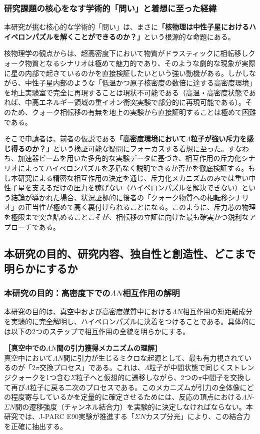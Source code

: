 \documentclass[11pt,a4j,dvipdfmx]{jarticle} 					%
\newcommand{\研究課題名}{加速器実験による短距離バリオン間相互作用の解明と中性子星ハイペロンパズルの解決}
\newcommand{\研究機関名}{東北大学}
\newcommand{\研究代表者氏名}{市川裕大}
\newcommand{\研究期間の最終元号年度}{13}  %
\begin{document}
\subsubsection{研究課題の核心をなす学術的「問い」と着想に至った経緯}
本研究が挑む核心的な学術的「問い」は、まさに\textbf{「核物理は中性子星におけるハイペロンパズルを解くことができるのか？」}という根源的な命題にある。

核物理学の観点からは、超高密度下において物質がドラスティックに相転移しクォーク物質となるシナリオは極めて魅力的であり、そのような劇的な現象が実際に星の内部で起きているのかを直接検証したいという強い動機がある。しかしながら、中性子星内部のような「低温かつ原子核密度の数倍に達する高密度環境」を地上実験室で完全に再現することは現状不可能である（高温・高密度状態であれば、中高エネルギー領域の重イオン衝突実験で部分的に再現可能である）。そのため、クォーク相転移の有無を地上の実験から直接証明することは極めて困難である。

そこで申請者は、前者の仮説である\textbf{「高密度環境において$\Lambda$粒子が強い斥力を感じ得るのか？」}という検証可能な疑問にフォーカスする着想に至った。すなわち、加速器ビームを用いた多角的な実験データに基づき、相互作用の斥力化シナリオによってハイペロンパズルを矛盾なく説明できるか否かを徹底検証する。もし本研究による精密な相互作用の決定を通じ、斥力化メカニズムのみでは重い中性子星を支えるだけの圧力を稼げない（ハイペロンパズルを解決できない）という結論が導かれた場合、状況証拠的に後者の「クォーク物質への相転移シナリオ」の正当性が極めて高く裏付けられることになる。このように、斥力芯の物理を極限まで突き詰めることこそが、相転移の立証に向けた最も確実かつ鋭利なアプローチである。

\subsection{本研究の目的、研究内容、独自性と創造性、どこまで明らかにするか}
\subsubsection{本研究の目的：高密度下での$\Lambda N$相互作用の解明}
本研究の目的は、真空中および高密度媒質中における$\Lambda N$相互作用の短距離成分を実験的に完全解明し、ハイペロンパズルに決着をつけることである。具体的には以下の2つのステップで相互作用の全貌を明らかにする。

\noindent
\textbf{［真空中での$\Lambda N$間の引力獲得メカニズムの理解］}\\
真空中において$\Lambda N$間に引力が生じるミクロな起源として、最も有力視されているのが「$2\pi$交換プロセス」である。これは、$\Lambda$粒子が中間状態で同じくストレンジクォークを1つ含む$\Sigma$粒子へと仮想的に遷移しながら、2つの$\pi$中間子を交換して再び$\Lambda$粒子に戻る二次のプロセスである。このメカニズムが引力の全体像にどの程度寄与しているかを定量的に確定させるためには、反応の頂点における$\Lambda N$-$\Sigma N$間の遷移強度（チャンネル結合力）を実験的に決定しなければならない。本研究では、J-PARC E90実験が推進する「$\Sigma N$カスプ分光」により、この結合力を正確に抽出する。
\end{document}
